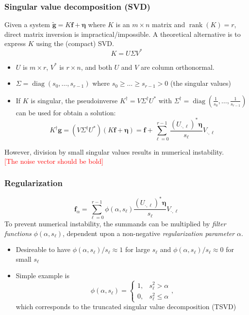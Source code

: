 \documentclass{beamer}
\newcommand{\ToDo}[1]{\textcolor{red}{[#1]}}
\newcommand{\noise}{\eta}	%
\newcommand{\gVec}{\mathbf{g}}	%
\newcommand{\gnoiseVec}{\widetilde{\mathbf{g}}}	%
\newcommand{\kMat}{K}	%
\newcommand{\fVec}{\mathbf{f}}	%
\newcommand{\ctrans}{*}	%
\DeclareMathOperator{\diag}{diag}	%
\DeclareMathOperator{\rank}{rank}	%
\newcommand{\noiseVec}{\mathbf{\noise}}	%
\newcommand{\singular}{s}	%
\newcommand{\regparam}{\alpha}
\newcommand{\filt}{\phi}
\begin{document}
\begin{frame}
\frametitle{Singular value decomposition (SVD)}
Given a system $\gnoiseVec = \kMat\fVec + \noiseVec$ where $\kMat$ is an $m \times n$ matrix and $\rank(\kMat) = r$, direct matrix inversion is impractical/impossible. A theoretical alternative is to express $\kMat$ using the (compact) SVD.
\[\kMat = U\Sigma{V^\ctrans}\]
\begin{itemize}
\item $U$ is $m \times r$, $V^\ctrans$ is $r \times n$, and both $U$ and $V$ are column orthonormal.
\item $\Sigma = \diag(\singular_0,\ldots,\singular_{r-1})$ where $s_0 \geq \ldots \geq \singular_{r-1} > 0$ (the singular values)
\item If $\kMat$ is singular, the pseudoinverse $K^\dagger = V\Sigma^\dagger{U}^\ctrans$ with $\Sigma^\dagger = \diag\left(\frac{1}{\singular_0},\ldots,\frac{1}{\singular_{r-1}}\right)$ can be used for obtain a solution:
\[\kMat^\dagger{\gVec} = (V\Sigma^\dagger{U}^\ctrans)(\kMat\fVec + \noiseVec) = \fVec + \sum_{\ell=0}^{r-1} \frac{(U_{\cdot,\ell})^\ctrans{\noiseVec}}{\singular_{\ell}}V_{\cdot,\ell}\]
\end{itemize}
However, division by small singular values results in numerical instability. \\
\ToDo{The noise vector should be bold}
\end{frame}

\begin{frame}
\frametitle{Regularization}
\[\fVec_\regparam = \sum_{\ell=0}^{r-1} \filt(\regparam,\singular_\ell)\frac{(U_{\cdot,\ell})^\ctrans{\noiseVec}}{\singular_{\ell}}V_{\cdot,\ell}\]
To prevent numerical instability, the summands can be multiplied by \textit{filter functions} $\filt(\regparam,\singular_{\ell})$, dependent upon a non-negative \textit{regularization parameter} $\regparam$.
\begin{itemize}
\item Desireable to have $\filt(\regparam,\singular_\ell)/\singular_\ell \approx 1$ for large $\singular_\ell$ and $\filt(\regparam,\singular_\ell)/\singular_\ell \approx 0$ for small $\singular_\ell$
\item Simple example is 
\[\filt(\regparam,\singular_\ell) = \begin{cases}
1, & \singular^2_\ell > \regparam \\
0, & \singular^2_\ell \leq \regparam
\end{cases},\]
which corresponds to the truncated singular value decomposition (TSVD) \cite{Vogel:2002}
\end{itemize}
\end{frame}
\end{document}
